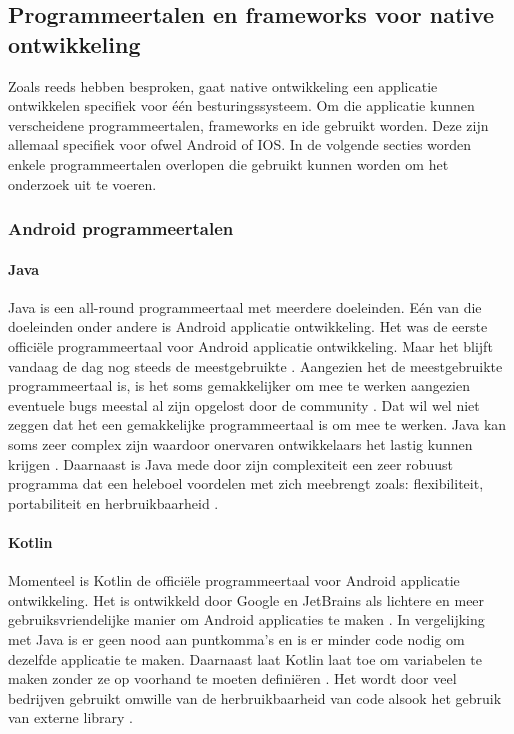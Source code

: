 \subsection{Programmeertalen en frameworks voor native ontwikkeling}
Zoals reeds hebben besproken, gaat native ontwikkeling een applicatie ontwikkelen 
specifiek voor één besturingssysteem. Om die 
applicatie kunnen verscheidene programmeertalen, frameworks 
en \acrshort{ide} gebruikt worden. Deze zijn allemaal specifiek voor ofwel Android of IOS. In de volgende 
secties worden enkele programmeertalen overlopen die gebruikt kunnen worden om het onderzoek uit te voeren.

\subsubsection{Android programmeertalen}
\paragraph{Java}
Java is een all-round programmeertaal met meerdere doeleinden. Eén van die doeleinden 
onder andere is Android applicatie ontwikkeling. Het was de eerste officiële programmeertaal 
voor Android applicatie ontwikkeling. Maar het blijft vandaag de dag nog steeds de 
meestgebruikte \autocite{harkiran2022}. Aangezien het de meestgebruikte programmeertaal 
is, is het soms gemakkelijker om mee te werken aangezien eventuele bugs meestal al zijn 
opgelost door de community \autocite{Thorndyke2021}. Dat wil wel niet zeggen dat het een 
gemakkelijke programmeertaal is om mee te werken. Java kan soms zeer complex zijn waardoor 
onervaren ontwikkelaars het lastig kunnen krijgen \autocite{Kesavan2021}. Daarnaast is Java 
mede door zijn complexiteit een zeer robuust programma dat een heleboel voordelen met zich 
meebrengt zoals: flexibiliteit, portabiliteit en herbruikbaarheid \autocite{Kesavan2021}.

\paragraph{Kotlin}
Momenteel is Kotlin de officiële programmeertaal voor Android applicatie ontwikkeling. 
Het is ontwikkeld door Google en \Gls{JetBrains} als lichtere en meer gebruiksvriendelijke
manier om Android applicaties te maken \autocite{Thorndyke2021}. In vergelijking met Java 
is er geen nood aan puntkomma's en is er minder code nodig om dezelfde applicatie te maken. Daarnaast laat Kotlin 
laat toe om variabelen te maken zonder ze op voorhand te moeten definiëren \autocite{Thorndyke2021}. 
Het wordt door veel bedrijven gebruikt omwille van de herbruikbaarheid van code alsook het 
gebruik van externe \gls{library} \autocite{Kesavan2021}.

